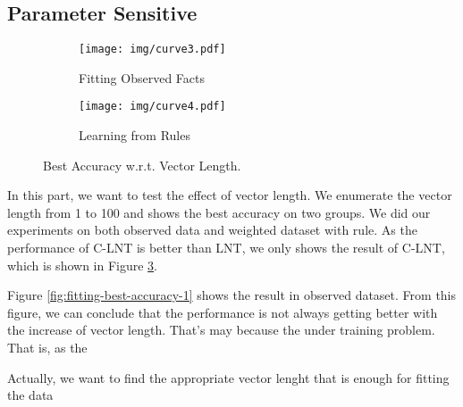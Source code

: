 
\subsection{Parameter Sensitive}

\begin{figure}[!]
    \centering
    \begin{subfigure}[]{0.5\textwidth}
        \texttt{[image: img/curve3.pdf]}
        \caption{Fitting Observed Facts}
        \label{fig:sensitive-best-accuracy-1}
    \end{subfigure}

    \begin{subfigure}[]{0.5\textwidth}
        \texttt{[image: img/curve4.pdf]}
        \caption{Learning from Rules }
        \label{fig:sensitive-best-accuracy-2}
    \end{subfigure}
    \caption{Best Accuracy w.r.t. Vector Length.}
    \label{fig:sensitive}
\end{figure}

In this part, we want to test the effect of vector length. We enumerate the vector length from 1 to 100 and shows the best accuracy on two groups. We did our experiments on both observed data and weighted dataset with rule. As the performance of C-LNT is better than LNT, we only shows the result of C-LNT, which is shown in Figure \ref{fig:sensitive}.

Figure \ref{fig:fitting-best-accuracy-1} shows the result in observed dataset.
From this figure, we can conclude that the performance is not always getting better with the increase of vector length. That's may because the under training problem. That is, as the

Actually, we want to find the appropriate vector lenght that is enough for fitting the data

